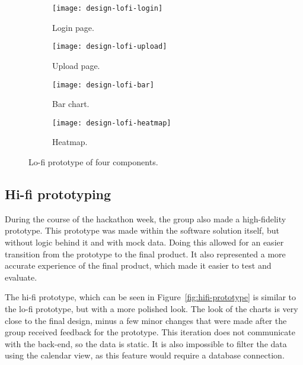 \begin{figure}[H]
    \centering
    \begin{subfigure}{.49\textwidth}
        \centering
        \texttt{[image: design-lofi-login]}
        \caption{Login page.
        }\label{subfig:lofi-login}
    \end{subfigure}
    \begin{subfigure}{.49\textwidth}
        \centering
        \texttt{[image: design-lofi-upload]}
        \caption{Upload page.
        }\label{subfig:lofi-upload}
    \end{subfigure}
    \par\medskip
    \begin{subfigure}{.49\textwidth}
        \centering
        \texttt{[image: design-lofi-bar]}
        \caption{Bar chart.
        }\label{subfig:lofi-bar}
    \end{subfigure}
    \begin{subfigure}{.49\textwidth}
        \centering
        \texttt{[image: design-lofi-heatmap]}
        \caption{Heatmap.
        }\label{subfig:lofi-heatmap}
    \end{subfigure}
    \caption{Lo-fi prototype of four components.
    }\label{fig:lofi-prototype}
\end{figure}

\subsection{Hi-fi prototyping}\label{subsec:hi-fi-prototyping}

During the course of the hackathon week, the group also made a high-fidelity prototype.
This prototype was made within the software solution itself, but without logic behind it and with mock data.
Doing this allowed for an easier transition from the prototype to the final product.
It also represented a more accurate experience of the final product, which made it easier to test and evaluate.

The hi-fi prototype, which can be seen in Figure~\ref{fig:hifi-prototype} is similar to the lo-fi prototype, but with a
more polished look.
The look of the charts is very close to the final design, minus a few minor changes that were made after the group
received feedback for the prototype.
This iteration does not communicate with the back-end, so the data is static.
It is also impossible to filter the data using the calendar view, as this feature would require a database connection.

